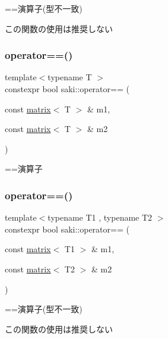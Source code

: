==演算子(型不一致) 

この関数の使用は推奨しない \mbox{\label{namespacesaki_a67e5e15cae6e9152e0bd5ac2e1705da4}} 
\subsubsection{\texorpdfstring{operator==()}{operator==()}\hspace{0.1cm}{\footnotesize\ttfamily [10/11]}}
{\footnotesize\ttfamily template$<$typename T $>$ \\
constexpr bool saki\+::operator== (\begin{DoxyParamCaption}\item[{const \mbox{\hyperlink{classsaki_1_1matrix}{matrix}}$<$ T $>$ \&}]{m1,  }\item[{const \mbox{\hyperlink{classsaki_1_1matrix}{matrix}}$<$ T $>$ \&}]{m2 }\end{DoxyParamCaption})}



==演算子 

\mbox{\label{namespacesaki_a1ffbf8122dda5209dc384e64747bec32}} 
\subsubsection{\texorpdfstring{operator==()}{operator==()}\hspace{0.1cm}{\footnotesize\ttfamily [11/11]}}
{\footnotesize\ttfamily template$<$typename T1 , typename T2 $>$ \\
constexpr bool saki\+::operator== (\begin{DoxyParamCaption}\item[{const \mbox{\hyperlink{classsaki_1_1matrix}{matrix}}$<$ T1 $>$ \&}]{m1,  }\item[{const \mbox{\hyperlink{classsaki_1_1matrix}{matrix}}$<$ T2 $>$ \&}]{m2 }\end{DoxyParamCaption})}



==演算子(型不一致) 

この関数の使用は推奨しない \mbox{\label{namespacesaki_aa5b66f18d7c8c94b4c50731449ed3240}} 
